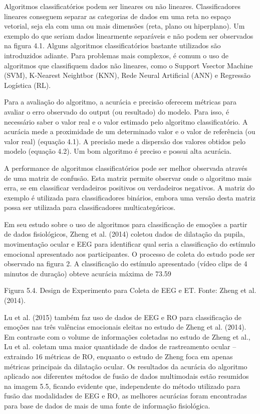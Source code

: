 Algoritmos classificatórios
podem ser lineares ou não lineares. 
Classificadores lineares conseguem separar 
as categorias de dados em uma reta no espaço vetorial, seja ela com uma ou mais dimensões (reta, plano ou hiperplano). Um exemplo do que seriam dados linearmente separáveis e não podem ser observados na figura 4.1.
Alguns algoritmos classificatórios bastante utilizados são introduzidos adiante. Para problemas mais complexos,
é comum o uso de algoritmos que classifiquem dados não lineares, como o Support Vsector Machine (SVM), K-Nearest Neightbor (KNN), 
Rede Neural Artificial (ANN) e Regressão Logística (RL).

Para a avaliação do algoritmo, a acurácia e precisão oferecem métricas para avaliar o erro observado do output (ou resultado) do modelo. 
Para isso, é necessário saber o valor real e o valor estimado pelo algoritmo classificatório. 
A acurácia mede a proximidade de um determinado valor e o valor de referência (ou valor real) (equação 4.1). 
A precisão mede a dispersão dos valores obtidos pelo modelo (equação 4.2). Um bom algoritmo é preciso e possui alta acurácia. 

A performance de algoritmos classificatórios pode ser 
melhor observada através de uma matriz de confusão. 
Esta matriz permite observar onde o algoritmo mais erra, se em 
classificar verdadeiros positivos ou verdadeiros negativos. 
A matriz do exemplo é utilizada para classificadores binários,
embora uma versão desta matriz possa ser utilizada para classificadores multicategóricos. 


Em seu estudo sobre o uso de algoritmos para classificação de emoções a partir de dados fisiológicos, Zheng et al. (2014) coletou dados de dilatação da pupila, movimentação ocular e EEG para identificar qual seria a classificação do estímulo emocional apresentado aos participantes. O processo de coleta do estudo pode ser observado na figura 2. A classificação do estímulo apresentado (vídeo clips de 4 minutos de duração) obteve acurácia máxima de 73.59%
 
Figura 5.4. Design de Experimento para Coleta de EEG e ET. Fonte: Zheng et al. (2014).

Lu et al. (2015) também faz uso de dados de EEG e RO para classificação de emoções nas três valências emocionais eleitas no estudo de Zheng et al. (2014). Em contraste com o volume de informações coletadas no estudo de Zheng et al., Lu et al. coletam uma maior quantidade de dados de rastreamento ocular – extraindo 16 métricas de RO, enquanto o estudo de Zheng foca em apenas métricas principais da dilatação ocular. Os resultados da acurácia do algoritmo aplicado aos diferentes métodos de fusão de dados multimodais estão resumidos na imagem 5.5, ficando evidente que, independente do método utilizado para fusão das modalidades de EEG e RO, as melhores acurácias foram encontradas para base de dados de mais de uma fonte de informação fisiológica. 
 
